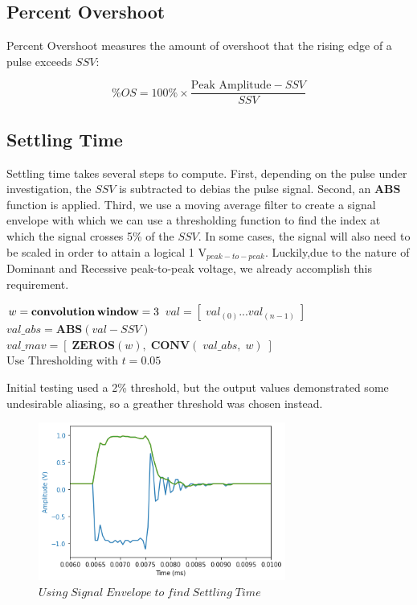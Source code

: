 \documentclass[conference]{IEEEtran}
\begin{document}
\subsection{Percent Overshoot}
Percent Overshoot measures the amount of overshoot that the rising edge of a pulse exceeds $SSV$:

\begin{equation*}
    \%OS = 100\% \times \frac{\text{Peak Amplitude} - SSV}{SSV}
\end{equation*}

\subsection{Settling Time}
Settling time takes several steps to compute. First, depending on the pulse under investigation, the $SSV$ is subtracted to debias the pulse signal. Second, an $\textbf{ABS}$ function is applied. Third, we use a moving average filter to create a signal envelope with which we can use a thresholding function to find the index at which the signal crosses 5\% of the $SSV$. In some cases, the signal will also need to be scaled in order to attain a logical 1 V$_{peak-to-peak}$. Luckily,due to the nature of Dominant and Recessive peak-to-peak voltage, we already accomplish this requirement.

\medbreak
\begin{algorithmic}
\STATE $w = \textbf{convolution\,window} = 3$
\STATE $val = [\;val_{(0)} ... val_{(n-1)}\;]$
\STATE $val\_abs = \textbf{ABS}(val - SSV)$
\STATE $val\_mav = [\;\textbf{ZEROS}(w),\;\textbf{CONV}(\;val\_abs,\;w)\;]$
\STATE $ $
\STATE $\text{Use Thresholding with } t = 0.05$
\end{algorithmic}
\medbreak

 Initial testing used a 2\% threshold, but the output values demonstrated some undesirable aliasing, so a greather threshold was chosen instead.

\begin{figure}[htb]
\centering
\includegraphics[width=3.2in]{figures/54_settling.png}
\caption{$Using\;Signal\;Envelope\;to\;find\;Settling\;Time$}
\label{fig:Settling}
\end{figure}
\end{document}
